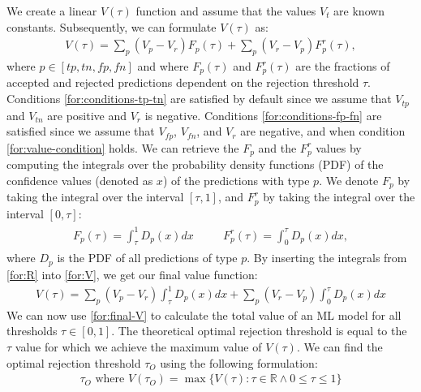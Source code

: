 %
%
We create a linear $V(\tau)$ function and assume that the values $V_t$ are known constants.
%
Subsequently, we can formulate $V(\tau)$ as:
\begin{align}
    \label{for:V}
    V(\tau) = \sum_{p} (V_p - V_r)F_p(\tau) + \sum_{p} (V_r - V_p)F^r_{p}(\tau),
\end{align}
%
where $p \in [tp, tn, fp, fn]$ and where $F_p(\tau)$ and $F_p^r(\tau)$ are the fractions of accepted and rejected predictions dependent on the rejection threshold $\tau$.
%
Conditions \ref{for:conditions-tp-tn} are satisfied by default since we assume that $V_{tp}$ and $V_{tn}$ are positive and $V_r$ is negative.
%
Conditions \ref{for:conditions-fp-fn} are satisfied since we assume that $V_{fp}$, $V_{fn}$, and $V_r$ are negative, and when condition \ref{for:value-condition} holds.
% 
We can retrieve the $F_p$ and the $F_p^r$ values by computing the integrals over the probability density functions (PDF) of the confidence values (denoted as $x$) of the predictions with type $p$.
%
We denote $F_p$ by taking the integral over the interval $[\tau, 1]$, and $F_p^r$ by taking the integral over the interval $[0, \tau]$:
%
\begin{align}
    \label{for:R}
    \begin{aligned}
        F_{p}(\tau) = \int_\tau^1 D_p(x)dx & \quad & F_p^r(\tau) = \int_0^\tau D_p(x)dx,
    \end{aligned}
\end{align}
%
where $D_p$ is the PDF of all predictions of type $p$.
%
By inserting the integrals from \ref{for:R} into \ref{for:V}, we get our final value function:
%
\begin{align}
    \label{for:final-V}
    V(\tau) = \sum_p (V_p - V_r)\int_\tau^1 D_p(x)dx + \sum_p (V_r - V_p)\int_0^\tau D_p(x)dx
\end{align}
%
We can now use \ref{for:final-V} to calculate the total value of an  ML model for all thresholds $\tau \in [0, 1]$.
%
The theoretical optimal rejection threshold is equal to the $\tau$ value for which we achieve the maximum value of $V(\tau)$.
%
We can find the optimal rejection threshold $\tau_O$ using the following formulation:
%
\begin{align}
    \label{for:optimal-threshold}
    \tau_O \text{ where } V(\tau_O) = \max \{V(\tau): \tau \in \mathbb{R} \wedge 0 \leq \tau \leq 1 \}
\end{align}

